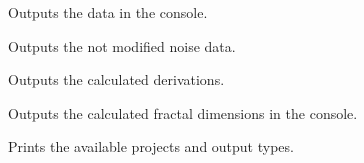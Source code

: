 \begin{asparadesc}
\item[\code{output:console}]
Outputs the data in the console.
\item[\code{output:noise}]
Outputs the not modified noise data.
\item[\code{output:derivated}]
Outputs the calculated derivations.
\item[\code{output:fractal}]
Outputs the calculated fractal dimensions in the console.
\item[\code{output:projects}]
Prints the available projects and output types.
\end{asparadesc}

